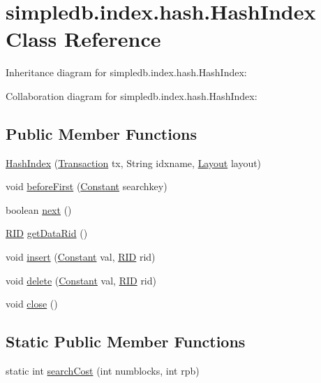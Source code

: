 \hypertarget{classsimpledb_1_1index_1_1hash_1_1HashIndex}{}\section{simpledb.\+index.\+hash.\+Hash\+Index Class Reference}
\label{classsimpledb_1_1index_1_1hash_1_1HashIndex}


Inheritance diagram for simpledb.\+index.\+hash.\+Hash\+Index\+:


Collaboration diagram for simpledb.\+index.\+hash.\+Hash\+Index\+:
\subsection*{Public Member Functions}
\begin{DoxyCompactItemize}
\item 
\hyperlink{classsimpledb_1_1index_1_1hash_1_1HashIndex_a3a54c91a803eae272f449ab878274fc2}{Hash\+Index} (\hyperlink{classsimpledb_1_1tx_1_1Transaction}{Transaction} tx, String idxname, \hyperlink{classsimpledb_1_1record_1_1Layout}{Layout} layout)
\item 
void \hyperlink{classsimpledb_1_1index_1_1hash_1_1HashIndex_a23b60680c25ec3ba70d92e5fde16f059}{before\+First} (\hyperlink{classsimpledb_1_1query_1_1Constant}{Constant} searchkey)
\item 
boolean \hyperlink{classsimpledb_1_1index_1_1hash_1_1HashIndex_a07532e9c86a7d28791f9bed10a27387f}{next} ()
\item 
\hyperlink{classsimpledb_1_1record_1_1RID}{R\+ID} \hyperlink{classsimpledb_1_1index_1_1hash_1_1HashIndex_ae8318b51f79a93009bcf9806aacda405}{get\+Data\+Rid} ()
\item 
void \hyperlink{classsimpledb_1_1index_1_1hash_1_1HashIndex_a8fd2cc37db3d7b254658fdd4b2814f40}{insert} (\hyperlink{classsimpledb_1_1query_1_1Constant}{Constant} val, \hyperlink{classsimpledb_1_1record_1_1RID}{R\+ID} rid)
\item 
void \hyperlink{classsimpledb_1_1index_1_1hash_1_1HashIndex_a76d2d6f98901db61549cfe51a1433d45}{delete} (\hyperlink{classsimpledb_1_1query_1_1Constant}{Constant} val, \hyperlink{classsimpledb_1_1record_1_1RID}{R\+ID} rid)
\item 
void \hyperlink{classsimpledb_1_1index_1_1hash_1_1HashIndex_abc28a52b702d34572280aa10c20f1f43}{close} ()
\end{DoxyCompactItemize}
\subsection*{Static Public Member Functions}
\begin{DoxyCompactItemize}
\item 
static int \hyperlink{classsimpledb_1_1index_1_1hash_1_1HashIndex_ae527655fdcef3f63fca081b59dd45b31}{search\+Cost} (int numblocks, int rpb)
\end{DoxyCompactItemize}
